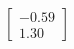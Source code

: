 \documentclass[preview]{standalone}
\begin{document}
\begin{align*}
\begin{bmatrix} -0.59 \\ 1.30 \end{bmatrix}
\end{align*}
\end{document}
